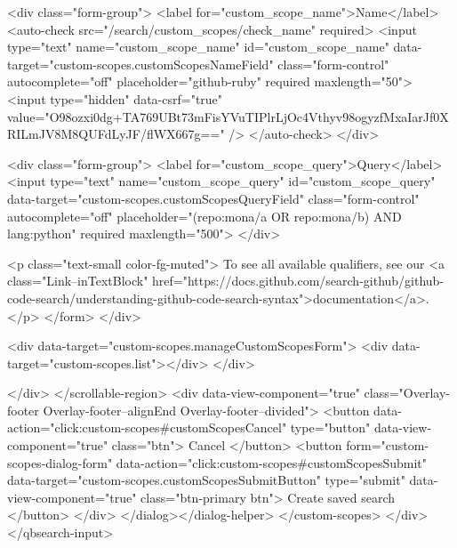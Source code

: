           <div class="form-group">
            <label for="custom_scope_name">Name</label>
            <auto-check src="/search/custom_scopes/check_name" required>
              <input
                type="text"
                name="custom_scope_name"
                id="custom_scope_name"
                data-target="custom-scopes.customScopesNameField"
                class="form-control"
                autocomplete="off"
                placeholder="github-ruby"
                required
                maxlength="50">
              <input type="hidden" data-csrf="true" value="O98ozxi0dg+TA769UBt73mFisYVuTIPlrLjOc4Vthyv98ogyzfMxaIarJf0XRILmJV8M8QUFdLyJF/flWX667g==" />
            </auto-check>
          </div>

          <div class="form-group">
            <label for="custom_scope_query">Query</label>
            <input
              type="text"
              name="custom_scope_query"
              id="custom_scope_query"
              data-target="custom-scopes.customScopesQueryField"
              class="form-control"
              autocomplete="off"
              placeholder="(repo:mona/a OR repo:mona/b) AND lang:python"
              required
              maxlength="500">
          </div>

          <p class="text-small color-fg-muted">
            To see all available qualifiers, see our <a class="Link--inTextBlock" href="https://docs.github.com/search-github/github-code-search/understanding-github-code-search-syntax">documentation</a>.
          </p>
</form>        </div>

        <div data-target="custom-scopes.manageCustomScopesForm">
          <div data-target="custom-scopes.list"></div>
        </div>

</div>
      </scrollable-region>
      <div data-view-component="true" class="Overlay-footer Overlay-footer--alignEnd Overlay-footer--divided">          <button data-action="click:custom-scopes#customScopesCancel" type="button" data-view-component="true" class="btn">    Cancel
</button>
          <button form="custom-scopes-dialog-form" data-action="click:custom-scopes#customScopesSubmit" data-target="custom-scopes.customScopesSubmitButton" type="submit" data-view-component="true" class="btn-primary btn">    Create saved search
</button>
</div>
</dialog></dialog-helper>
    </custom-scopes>
  </div>
</qbsearch-input>


